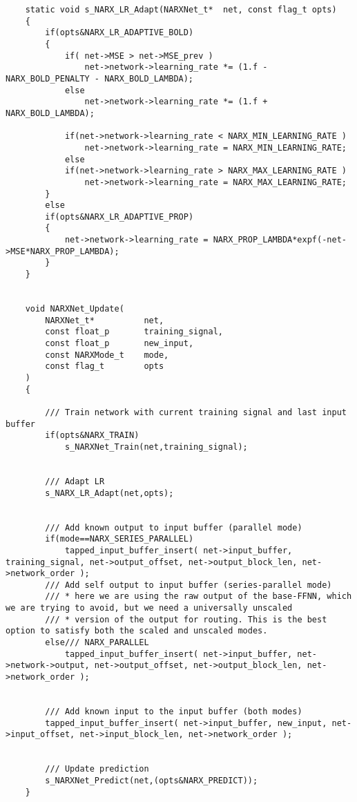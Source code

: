 \begin{lstlisting}
	static void s_NARX_LR_Adapt(NARXNet_t*	net, const flag_t opts)
	{
		if(opts&NARX_LR_ADAPTIVE_BOLD)
		{
			if( net->MSE > net->MSE_prev )
				net->network->learning_rate *= (1.f - NARX_BOLD_PENALTY - NARX_BOLD_LAMBDA);
			else
				net->network->learning_rate *= (1.f + NARX_BOLD_LAMBDA);

			if(net->network->learning_rate < NARX_MIN_LEARNING_RATE )
				net->network->learning_rate = NARX_MIN_LEARNING_RATE;
			else
			if(net->network->learning_rate > NARX_MAX_LEARNING_RATE )
				net->network->learning_rate = NARX_MAX_LEARNING_RATE;
		}
		else
		if(opts&NARX_LR_ADAPTIVE_PROP)
		{
			net->network->learning_rate = NARX_PROP_LAMBDA*expf(-net->MSE*NARX_PROP_LAMBDA);
		}
	}


	void NARXNet_Update(
		NARXNet_t*			net,
		const float_p		training_signal,
		const float_p		new_input,
		const NARXMode_t	mode,
		const flag_t		opts
	)
	{

		/// Train network with current training signal and last input buffer
		if(opts&NARX_TRAIN)
			s_NARXNet_Train(net,training_signal);


		/// Adapt LR
		s_NARX_LR_Adapt(net,opts);


		/// Add known output to input buffer (parallel mode)
		if(mode==NARX_SERIES_PARALLEL)
			tapped_input_buffer_insert( net->input_buffer, training_signal, net->output_offset, net->output_block_len, net->network_order );
		/// Add self output to input buffer (series-parallel mode)
		/// * here we are using the raw output of the base-FFNN, which we are trying to avoid, but we need a universally unscaled
		/// * version of the output for routing. This is the best option to satisfy both the scaled and unscaled modes.
		else/// NARX_PARALLEL
			tapped_input_buffer_insert( net->input_buffer, net->network->output, net->output_offset, net->output_block_len, net->network_order );


		/// Add known input to the input buffer (both modes)
		tapped_input_buffer_insert( net->input_buffer, new_input, net->input_offset, net->input_block_len, net->network_order );


		/// Update prediction
		s_NARXNet_Predict(net,(opts&NARX_PREDICT));
	}

\end{lstlisting}
